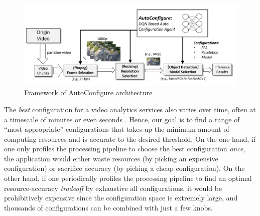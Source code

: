 \begin{figure}[!t]
	\centerline{\includegraphics[width=0.9\linewidth]{figures/framework.pdf}}
	\caption{Framework of AutoConfigure architecture}
	\label{fig: framework}
\end{figure}



%

The \emph{best} configuration for a video analytics services also varies over time, often at a timescale of minutes or even seconds \cite{jiang2018chameleon}. Hence, our goal is to find a range of ``most appropriate'' configurations that takes up the minimum amount of computing resources and is accurate to the desired threshold. On the one hand, if one only profiles the processing pipeline to choose the best configuration \emph{once}, the application would either waste resources (by picking an expensive configuration) or sacrifice accuracy (by picking a cheap configuration). On the other hand, if one periodically profiles the processing pipeline to find an optimal resource-accuracy \emph{tradeoff} by exhaustive all configurations, it would be prohibitively expensive since the configuration space is extremely large, and thousands of configurations can be combined with just a few knobs.

